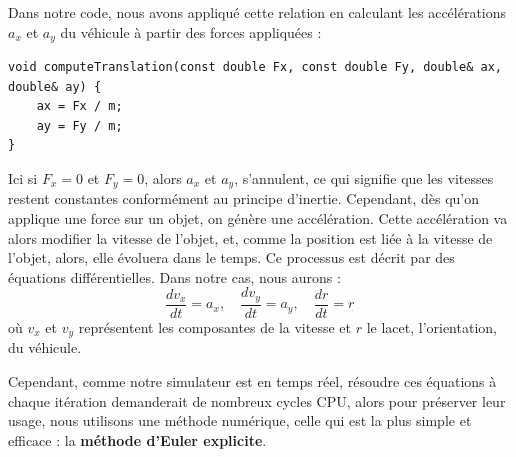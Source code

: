 \documentclass[a4paper,12pt]{report}
\begin{document}
    Dans notre code, nous avons appliqué cette relation en calculant les accélérations $a_x$ et $a_y$ du véhicule à partir des forces appliquées :


    \begin{lstlisting}[style=CStyle]
void computeTranslation(const double Fx, const double Fy, double& ax, double& ay) {
    ax = Fx / m;
    ay = Fy / m;
}

    \end{lstlisting}

    Ici si $F_x = 0$ et $F_y = 0$, alors $a_x$ et $a_y$, s'annulent, ce qui signifie que les vitesses restent constantes conformément au principe d'inertie.
    Cependant, dès qu'on applique une force sur un objet, on génère une accélération. Cette accélération va alors modifier la vitesse de l'objet, et, comme la position est liée à la vitesse de l'objet, alors, elle évoluera dans le temps. Ce processus est décrit par des équations différentielles. Dans notre cas, nous aurons :
    $$\frac{d v_x}{dt} = a_x, \quad \frac{d v_y}{dt} = a_y, \quad \frac{d r}{dt} = r_{\dot{}}$$
    où $v_x$ et $v_y$ représentent les composantes de la vitesse et $r$ le lacet, l'orientation, du véhicule.

    Cependant, comme notre simulateur est en temps réel, résoudre ces équations à chaque itération demanderait de nombreux cycles CPU, alors pour préserver leur usage, nous utilisons une méthode numérique, celle qui est la plus simple et efficace : la \textbf{méthode d'Euler explicite}.
\end{document}
